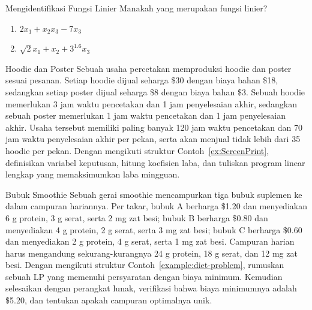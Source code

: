 \begin{ex}{Mengidentifikasi Fungsi Linier}{}
 Manakah yang merupakan fungsi linier?

\begin{enumerate}
    \item $2x_1 + x_2x_3 - 7x_3$
    \item $\sqrt{2}x_1 + x_2 + 3^{1.6}x_3$
\end{enumerate}
\end{ex}

\begin{ex}{Hoodie dan Poster}{}
\label{ex:HoodiePosters}
 Sebuah usaha percetakan memproduksi hoodie dan poster sesuai pesanan. Setiap hoodie dijual seharga \$30 dengan biaya bahan \$18, sedangkan setiap poster dijual seharga \$8 dengan biaya bahan \$3. Sebuah hoodie memerlukan 3 jam waktu pencetakan dan 1 jam penyelesaian akhir, sedangkan sebuah poster memerlukan 1 jam waktu pencetakan dan 1 jam penyelesaian akhir. Usaha tersebut memiliki paling banyak 120 jam waktu pencetakan dan 70 jam waktu penyelesaian akhir per pekan, serta akan menjual tidak lebih dari 35 hoodie per pekan. Dengan mengikuti struktur Contoh~\ref{ex:ScreenPrint}, definisikan variabel keputusan, hitung koefisien laba, dan tuliskan program linear lengkap yang memaksimumkan laba mingguan.
\end{ex}

\begin{ex}{Bubuk Smoothie}{}
 Sebuah gerai smoothie mencampurkan tiga bubuk suplemen ke dalam campuran hariannya. Per takar, bubuk A berharga \$1.20 dan menyediakan 6 g protein, 3 g serat, serta 2 mg zat besi; bubuk B berharga \$0.80 dan menyediakan 4 g protein, 2 g serat, serta 3 mg zat besi; bubuk C berharga \$0.60 dan menyediakan 2 g protein, 4 g serat, serta 1 mg zat besi. Campuran harian harus mengandung sekurang-kurangnya 24 g protein, 18 g serat, dan 12 mg zat besi. Dengan mengikuti struktur Contoh~\ref{example:diet-problem}, rumuskan sebuah LP yang memenuhi persyaratan dengan biaya minimum. Kemudian selesaikan dengan perangkat lunak, verifikasi bahwa biaya minimumnya adalah \$5.20, dan tentukan apakah campuran optimalnya unik.
\end{ex}


